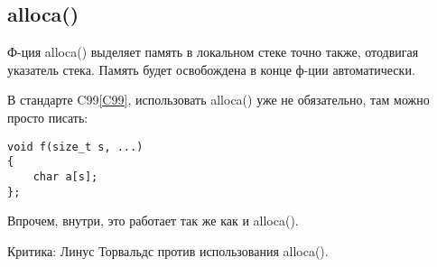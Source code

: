 ﻿\label{alloca}
\subsection{alloca()}

Ф-ция alloca() выделяет память в локальном стеке точно также, отодвигая указатель стека\cite[1.2.4]{REBook}.
Память будет освобождена в конце ф-ции автоматически.

В стандарте C99\ref{C99}, использовать alloca() уже не обязательно, там можно просто писать:

\begin{lstlisting}
void f(size_t s, ...)
{
	char a[s];
};
\end{lstlisting}

Впрочем, внутри, это работает так же как и alloca().

Критика: Линус Торвальдс против использования alloca()\cite{Torvalds:2003}.
